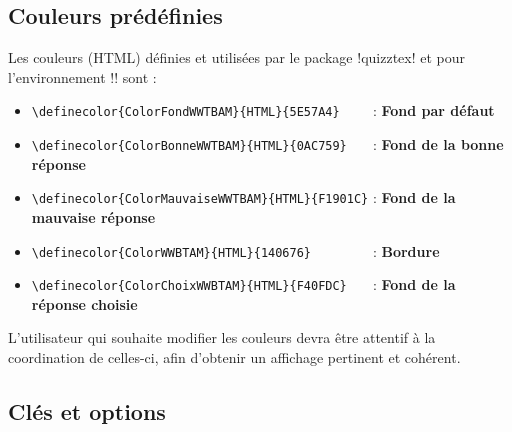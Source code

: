 \documentclass[french,a4paper,11pt]{article}
\begin{document}
\subsection{Couleurs prédéfinies}

\begin{tipblock}
Les couleurs (HTML) définies et utilisées par le package \packagetex!quizztex! et pour l'environnement \motcletex!\QuizzMillions! sont :

\begin{itemize}[leftmargin=*]
	\item \verb!\definecolor{ColorFondWWTBAM}{HTML}{5E57A4}    ! : \textcolor{ColorFondWWTBAM}{\textsf{\textbf{Fond par défaut}}}
	\item \verb!\definecolor{ColorBonneWWTBAM}{HTML}{0AC759}   ! : \textcolor{ColorBonneWWTBAM}{\textsf{\textbf{Fond de la bonne réponse}}}
	\item \verb!\definecolor{ColorMauvaiseWWTBAM}{HTML}{F1901C}! : \textcolor{ColorMauvaiseWWTBAM}{\textsf{\textbf{Fond de la mauvaise réponse}}}
	\item \verb!\definecolor{ColorWWBTAM}{HTML}{140676}        ! : \textcolor{ColorWWBTAM}{\textsf{\textbf{Bordure}}}
	\item \verb!\definecolor{ColorChoixWWBTAM}{HTML}{F40FDC}   ! : \textcolor{ColorChoixWWBTAM}{\textsf{\textbf{Fond de la réponse choisie}}}
\end{itemize}

L'utilisateur qui souhaite modifier les couleurs devra être attentif à la coordination de celles-ci, afin d'obtenir un affichage pertinent et cohérent.
\end{tipblock}

\begin{DemoCode}[]
\QuizzMillions{\lipsum[1][1-2]}
	{\lipsum[2][1]}{\lipsum[2][2]}{\lipsum[2][3]}{\lipsum[2][5]}
\end{DemoCode}

\subsection{Clés et options}
\end{document}
